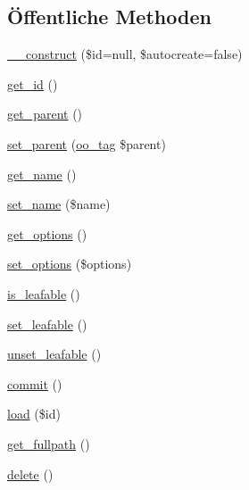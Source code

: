 \subsection*{Öffentliche Methoden}
\begin{DoxyCompactItemize}
\item 
\hyperlink{classSunhill_1_1Objects_1_1oo__tag_a87e388564164492cc850f0538c24d68f}{\+\_\+\+\_\+construct} (\$id=null, \$autocreate=false)
\item 
\hyperlink{classSunhill_1_1Objects_1_1oo__tag_a9f497d701164031c799a2bac81474fed}{get\+\_\+id} ()
\item 
\hyperlink{classSunhill_1_1Objects_1_1oo__tag_aa6366875f4e3bb7e54da6100e8d6b3b4}{get\+\_\+parent} ()
\item 
\hyperlink{classSunhill_1_1Objects_1_1oo__tag_a18e07d36208660c7f4686ff850a6213c}{set\+\_\+parent} (\hyperlink{classSunhill_1_1Objects_1_1oo__tag}{oo\+\_\+tag} \$parent)
\item 
\hyperlink{classSunhill_1_1Objects_1_1oo__tag_a370eb6f5d35d9498082596e04d330525}{get\+\_\+name} ()
\item 
\hyperlink{classSunhill_1_1Objects_1_1oo__tag_a94defee5e85591a645fb098d74d82623}{set\+\_\+name} (\$name)
\item 
\hyperlink{classSunhill_1_1Objects_1_1oo__tag_afb15dfbc835a029b910e22e5cc417741}{get\+\_\+options} ()
\item 
\hyperlink{classSunhill_1_1Objects_1_1oo__tag_a212672b37f3569f39cbc7e3d37c98717}{set\+\_\+options} (\$options)
\item 
\hyperlink{classSunhill_1_1Objects_1_1oo__tag_aaa3cf2ae4d4ef5534206939c5cc8d168}{is\+\_\+leafable} ()
\item 
\hyperlink{classSunhill_1_1Objects_1_1oo__tag_aaea0a8eb8ae8ce70bc5b6df52e35b29f}{set\+\_\+leafable} ()
\item 
\hyperlink{classSunhill_1_1Objects_1_1oo__tag_a6c068223329cbc7ddbc9e3f703982295}{unset\+\_\+leafable} ()
\item 
\hyperlink{classSunhill_1_1Objects_1_1oo__tag_a308b82d69943280f47777cf3815d617a}{commit} ()
\item 
\hyperlink{classSunhill_1_1Objects_1_1oo__tag_aee2ca422c8af3b677383bbe15655b0e0}{load} (\$id)
\item 
\hyperlink{classSunhill_1_1Objects_1_1oo__tag_ab6b0722a02d41ac1cbc6769695e7e89d}{get\+\_\+fullpath} ()
\item 
\hyperlink{classSunhill_1_1Objects_1_1oo__tag_a20f8b67adc86ea76a276af394c467f07}{delete} ()
\end{DoxyCompactItemize}
